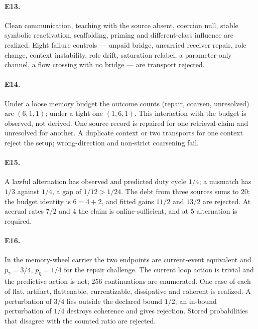 \paragraph{E13.} Clean communication, teaching with the source absent, coercion null, stable symbolic
reactivation, scaffolding, priming and different-class influence are realized. Eight failure
controls --- unpaid bridge, uncarried receiver repair, role change, context instability, role drift,
saturation relabel, a parameter-only channel, a flow crossing with no bridge --- are transport
rejected.

\paragraph{E14.} Under a loose memory budget the outcome counts (repair, coarsen, unresolved) are
$(6, 1, 1)$; under a tight one $(1, 6, 1)$. This interaction with the budget is observed, not derived.
One source record is repaired for one retrieval claim and unresolved for another. A duplicate context
or two transports for one context reject the setup; wrong-direction and non-strict coarsening fail.

\paragraph{E15.} A lawful alternation has observed and predicted duty cycle $1/4$; a mismatch has
$1/3$ against $1/4$, a gap of $1/12 > 1/24$. The debt from three sources sums to $20$; the budget
identity is $6 = 4 + 2$, and fitted gains $11/2$ and $13/2$ are rejected. At accrual rates $7/2$ and
$4$ the claim is online-sufficient, and at $5$ alternation is required.

\paragraph{E16.} In the memory-wheel carrier the two endpoints are current-event equivalent and
$p_\gamma = 3/4$, $p_\eta = 1/4$ for the repair challenge. The current loop action is trivial and the
predictive action is not; $256$ continuations are enumerated. One case of each of flat, artifact,
flattenable, currentizable, dissipative and coherent is realized. A perturbation of $3/4$ lies outside
the declared bound $1/2$; an in-bound perturbation of $1/4$ destroys coherence and gives rejection.
Stored probabilities that disagree with the counted ratio are rejected.
